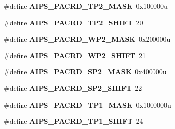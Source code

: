 \begin{DoxyCompactItemize}
\item 
\hypertarget{group___a_i_p_s___register___masks_ga64d283e39d1781d54a3a44b1736f767a}{}\#define {\bfseries A\+I\+P\+S\+\_\+\+P\+A\+C\+R\+D\+\_\+\+T\+P2\+\_\+\+M\+A\+S\+K}~0x100000u\label{group___a_i_p_s___register___masks_ga64d283e39d1781d54a3a44b1736f767a}

\item 
\hypertarget{group___a_i_p_s___register___masks_ga34c287165d901e8037627e8a6e57a21f}{}\#define {\bfseries A\+I\+P\+S\+\_\+\+P\+A\+C\+R\+D\+\_\+\+T\+P2\+\_\+\+S\+H\+I\+F\+T}~20\label{group___a_i_p_s___register___masks_ga34c287165d901e8037627e8a6e57a21f}

\item 
\hypertarget{group___a_i_p_s___register___masks_gaec091c81e6e47a41d51fd9830e499793}{}\#define {\bfseries A\+I\+P\+S\+\_\+\+P\+A\+C\+R\+D\+\_\+\+W\+P2\+\_\+\+M\+A\+S\+K}~0x200000u\label{group___a_i_p_s___register___masks_gaec091c81e6e47a41d51fd9830e499793}

\item 
\hypertarget{group___a_i_p_s___register___masks_gaba4accebc864bd50853123fb958ce2a2}{}\#define {\bfseries A\+I\+P\+S\+\_\+\+P\+A\+C\+R\+D\+\_\+\+W\+P2\+\_\+\+S\+H\+I\+F\+T}~21\label{group___a_i_p_s___register___masks_gaba4accebc864bd50853123fb958ce2a2}

\item 
\hypertarget{group___a_i_p_s___register___masks_ga1585ceedbbfaf2dd3fbeaffd269e848c}{}\#define {\bfseries A\+I\+P\+S\+\_\+\+P\+A\+C\+R\+D\+\_\+\+S\+P2\+\_\+\+M\+A\+S\+K}~0x400000u\label{group___a_i_p_s___register___masks_ga1585ceedbbfaf2dd3fbeaffd269e848c}

\item 
\hypertarget{group___a_i_p_s___register___masks_gaabe4dbc699fce93ae30f6f9aacd71fc5}{}\#define {\bfseries A\+I\+P\+S\+\_\+\+P\+A\+C\+R\+D\+\_\+\+S\+P2\+\_\+\+S\+H\+I\+F\+T}~22\label{group___a_i_p_s___register___masks_gaabe4dbc699fce93ae30f6f9aacd71fc5}

\item 
\hypertarget{group___a_i_p_s___register___masks_gabcd4b3b6c8f30bfb2c00734085d672ee}{}\#define {\bfseries A\+I\+P\+S\+\_\+\+P\+A\+C\+R\+D\+\_\+\+T\+P1\+\_\+\+M\+A\+S\+K}~0x1000000u\label{group___a_i_p_s___register___masks_gabcd4b3b6c8f30bfb2c00734085d672ee}

\item 
\hypertarget{group___a_i_p_s___register___masks_gac9dda4ac143e1f9b192d0c3881a5ab19}{}\#define {\bfseries A\+I\+P\+S\+\_\+\+P\+A\+C\+R\+D\+\_\+\+T\+P1\+\_\+\+S\+H\+I\+F\+T}~24\label{group___a_i_p_s___register___masks_gac9dda4ac143e1f9b192d0c3881a5ab19}


\end{DoxyCompactItemize}
